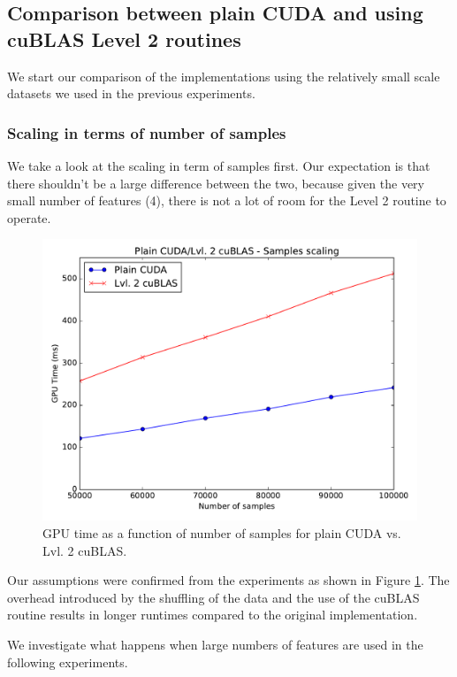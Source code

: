 \documentclass[11pt,a4paper]{article}
\begin{document}
\pagebreak

\subsection{Comparison between plain CUDA and using cuBLAS Level 2 routines}

We start our comparison of the implementations using the relatively small scale datasets
we used in the previous experiments.

\subsubsection*{Scaling in terms of number of samples}

We take a look at the scaling in term of samples first. Our expectation is that there shouldn't be a large difference
between the two, because given the very small number of features (4), there is not a lot of room
for the Level 2 routine to operate.

\begin{figure}[H]
	\centering
	\includegraphics[width=0.8\linewidth]{gpu_plain_vs_Lvl2cuBLAS-50k-100k.pdf}
	\caption{GPU time as a function of number of samples for plain CUDA vs. Lvl. 2 cuBLAS.}
	\label{fig:plain-cublas-n-samples}
\end{figure}

Our assumptions were confirmed from the experiments as shown in Figure \ref{fig:plain-cublas-n-samples}.
The overhead introduced by the shuffling of the data and the use of the cuBLAS routine
results in longer runtimes compared to the original implementation.

We investigate what happens when large numbers of features are used in the following experiments.
\end{document}
